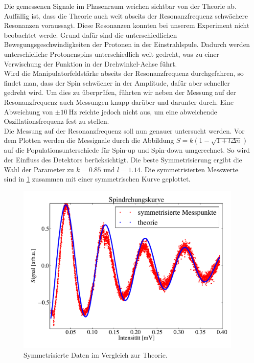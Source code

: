 \documentclass[paper=a4,
	fontsize=10pt,
	DIV=18,
	twocolumn,
	parskip=half
	]{scrartcl}
\numberwithin{equation}{section}    %
\begin{document}
Die gemessenen Signale im Phasenraum weichen sichtbar von der Theorie ab.
Auffällig ist, dass die Theorie auch weit abseits der Resonanzfrequenz schwächere Resonanzen voraussagt.
Diese Resonanzen konnten bei unserem Experiment nicht beobachtet werde.
Grund dafür sind die unterschiedlichen Bewegungsgeschwindigkeiten der Protonen in der Einstrahlspule.
Dadurch werden unterschieliche Protonenspins unterschiedlich weit gedreht, was zu einer Verwischung der Funktion in der Drehwinkel-Achse führt.\\
Wird die Manipulatorfeldstärke abseits der Resonanzfrequenz durchgefahren, so findet man, dass der Spin schwächer in der Amplitude, dafür aber schneller gedreht wird.
Um dies zu überprüfen, führten wir neben der Messung auf der Resonanzfrequenz auch Messungen knapp darüber und darunter durch. 
Eine Abweichung von $\pm \SI{10}{\hertz}$ reichte jedoch nicht aus, um eine abweichende Oszillationsfrequenz  fest zu stellen.\\
Die Messung auf der Resonanzfrequenz soll nun genauer untersucht werden. 
Vor dem Plotten werden die Messignale durch die Abbildung $S=k(1-\sqrt{1+l \Delta n})$ auf die Populationsunterschiede für Spin-up und Spin-down umgerechnet.
So wird der Einfluss des Detektors berücksichtigt.
Die beste Symmetrisierung ergibt die Wahl der Parameter zu $k=0.85$ und $l=1.14$. 
Die symmetrisierten Messwerte sind in \cref{symmetr} zusammen mit einer symmetrischen Kurve geplottet.

\begin{figure}[htp]
	\begin{center}
		\includegraphics[width=\columnwidth]{Data-Plots/11-Spindrehkurve.pdf}
		\caption{Symmetrisierte Daten im Vergleich zur Theorie.}
		\label{symmetr}
	\end{center}
\end{figure}
\end{document}

